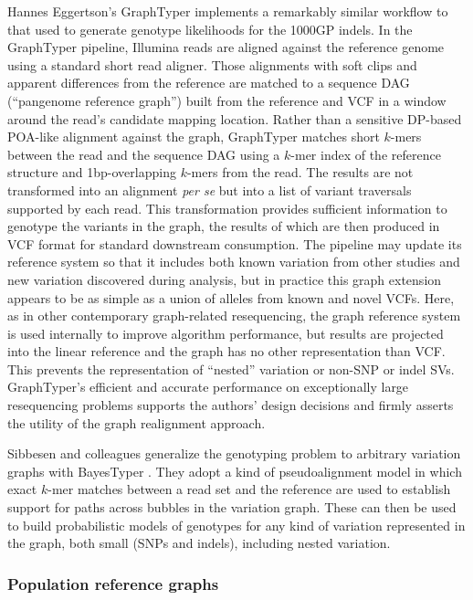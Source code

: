 Hannes Eggertson's GraphTyper \cite{eggertsson2017graphtyper} implements a remarkably similar workflow to that used to generate genotype likelihoods for the 1000GP indels.
In the GraphTyper pipeline, Illumina reads are aligned against the reference genome using a standard short read aligner.
Those alignments with soft clips and apparent differences from the reference are matched to a sequence DAG (``pangenome reference graph'') built from the reference and VCF in a window around the read's candidate mapping location.
Rather than a sensitive DP-based POA-like alignment against the graph, GraphTyper matches short $k$-mers between the read and the sequence DAG using a $k$-mer index of the reference structure and 1bp-overlapping $k$-mers from the read.
The results are not transformed into an alignment \emph{per se} but into a list of variant traversals supported by each read.
This transformation provides sufficient information to genotype the variants in the graph, the results of which are then produced in VCF format for standard downstream consumption.
The pipeline may update its reference system so that it includes both known variation from other studies and new variation discovered during analysis, but in practice this graph extension appears to be as simple as a union of alleles from known and novel VCFs.
Here, as in other contemporary graph-related resequencing, the graph reference system is used internally to improve algorithm performance, but results are projected into the linear reference and the graph has no other representation than VCF.
This prevents the representation of ``nested'' variation or non-SNP or indel SVs.
GraphTyper's efficient and accurate performance on exceptionally large resequencing problems supports the authors' design decisions and firmly asserts the utility of the graph realignment approach.

Sibbesen and colleagues generalize the genotyping problem to arbitrary variation graphs with BayesTyper \cite{sibbesen2018accurate}.
They adopt a kind of pseudoalignment model in which exact $k$-mer matches between a read set and the reference are used to establish support for paths across bubbles in the variation graph.
These can then be used to build probabilistic models of genotypes for any kind of variation represented in the graph, both small (SNPs and indels), including nested variation.

\subsubsection{Population reference graphs}

